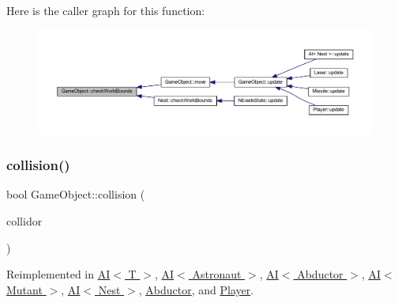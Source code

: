 Here is the caller graph for this function\+:
\nopagebreak
\begin{figure}[H]
\begin{center}
\leavevmode
\includegraphics[width=350pt]{class_game_object_a07bcaf0d87bd507f0a6e98abebd70e53_icgraph}
\end{center}
\end{figure}
\mbox{\label{class_game_object_a56a330813f51b91b2ad8aacb42b6d8ea}} 
\subsubsection{\texorpdfstring{collision()}{collision()}}
{\footnotesize\ttfamily bool Game\+Object\+::collision (\begin{DoxyParamCaption}\item[{const std\+::shared\+\_\+ptr$<$ \hyperlink{class_game_object}{Game\+Object} $>$ \&}]{collidor }\end{DoxyParamCaption})\hspace{0.3cm}{\ttfamily [virtual]}}



Reimplemented in \hyperlink{class_a_i_a15f7ffd56bf48c7475f9b50d82b60528}{A\+I$<$ T $>$}, \hyperlink{class_a_i_a15f7ffd56bf48c7475f9b50d82b60528}{A\+I$<$ Astronaut $>$}, \hyperlink{class_a_i_a15f7ffd56bf48c7475f9b50d82b60528}{A\+I$<$ Abductor $>$}, \hyperlink{class_a_i_a15f7ffd56bf48c7475f9b50d82b60528}{A\+I$<$ Mutant $>$}, \hyperlink{class_a_i_a15f7ffd56bf48c7475f9b50d82b60528}{A\+I$<$ Nest $>$}, \hyperlink{class_abductor_a247dff8e49fc656700c8cb16ed08252d}{Abductor}, and \hyperlink{class_player_a669d12e0034e51489a37268b2ca7aab0}{Player}.

